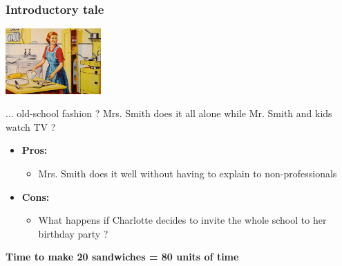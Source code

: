 \begin{frame}[containsverbatim]
\frametitle{Introductory tale}
\begin{center}
        {\includegraphics[height=2.5cm]{Day0/images/oldschool.jpg}}
\end{center}
\begin{center}
... old-school fashion ? Mrs. Smith does it all alone while Mr. Smith and kids watch TV ? 
\end{center}
\begin{center}
\begin{itemize}
	\item{\textbf{Pros: }
		\begin{itemize}
			\item{Mrs. Smith does it well without having to explain to non-professionals}
		\end{itemize}
	}
	\item{\textbf{Cons: }
		\begin{itemize}
			\item{What happens if Charlotte decides to invite the whole school to her birthday party ?}
		\end{itemize}
	}
\end{itemize}
\textbf{Time to make 20 sandwiches = 80 units of time}
\end{center}
\end{frame}


